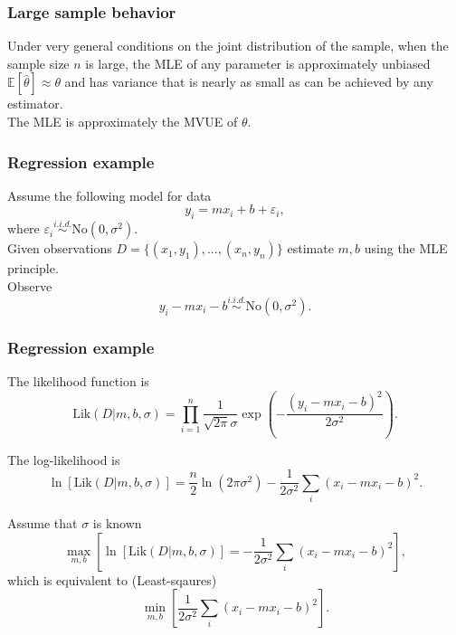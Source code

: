 \begin{frame}[fragile]\frametitle{Large sample behavior}

\begin{prop}
Under very general conditions on the joint distribution of
the sample, when the sample size $n$ is large, the MLE
of any parameter is approximately unbiased 
$\mathbb E[\hat{\theta}] \approx \theta$ and has variance that is nearly 
as small as can be achieved by any estimator. \\ 

The MLE is approximately the MVUE of $\theta$.
\end{prop}

\end{frame}

\begin{frame}[fragile]\frametitle{Regression example}

Assume the following model for data
$$y_i = m  x_i + b + \varepsilon_i,$$
where $\varepsilon_i \stackrel{i.i.d.}{\sim} \mbox{No}(0,\sigma^2).$
\\ 

Given observations $D=\{(x_1,y_1),...,(x_n,y_n)\}$ estimate 
$m,b$ using the MLE principle. \\ 

Observe
$$y_i - m  x_i - b \stackrel{i.i.d.}{\sim} \mbox{No}(0,\sigma^2).$$

\end{frame}


\begin{frame}[fragile]\frametitle{Regression example}
{\tiny

The likelihood function is
$$\mbox{Lik}(D|m,b,\sigma) = \prod_{i=1}^n \frac{1}{\sqrt{2 \pi}
  \sigma} \exp\left(-\frac{(y_i-m x_i-b)^2}{2 \sigma^2}\right).$$


The log-likelihood is
$$\ln[\mbox{Lik}(D|m,b,\sigma)] =  \frac{n}{2} \ln(2 \pi \sigma^2) -
\frac{1}{2 \sigma^2} \sum_i (x_i - m x_i - b )^2.$$ 

Assume that $\sigma$ is known
$$\max_{m,b}\left[ \ln[\mbox{Lik}(D|m,b,\sigma)] = -
\frac{1}{2 \sigma^2} \sum_i (x_i - m x_i - b )^2\right],$$ 
which is equivalent to (Least-sqaures)
$$\min_{m,b}\left[ \frac{1}{2 \sigma^2} \sum_i (x_i - m x_i - b )^2\right].$$ 



}

\end{frame}


